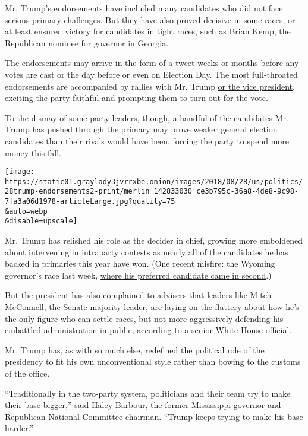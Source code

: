 Mr. Trump's endorsements have included many candidates who did not face
serious primary challenges. But they have also proved decisive in some
races, or at least ensured victory for candidates in tight races, such
as Brian Kemp, the Republican nominee for governor in Georgia.

The endorsements may arrive in the form of a tweet weeks or months
before any votes are cast or the day before or even on Election Day. The
most full-throated endorsements are accompanied by rallies with Mr.
Trump
\href{https://www.nytimes3xbfgragh.onion/2018/07/24/us/politics/kemp-cagle-georgia.html}{or
the vice president}, exciting the party faithful and prompting them to
turn out for the vote.

To the
\href{https://www.nytimes3xbfgragh.onion/2018/07/20/us/politics/trump-endorsement-kemp.html}{dismay
of some party leaders}, though, a handful of the candidates Mr. Trump
has pushed through the primary may prove weaker general election
candidates than their rivals would have been, forcing the party to spend
more money this fall.

\texttt{[image: https://static01.graylady3jvrrxbe.onion/images/2018/08/28/us/politics/28trump-endorsements2-print/merlin\_142833030\_ce3b795c-36a8-4de8-9c98-7fa3a06d1978-articleLarge.jpg?quality=75\\\&auto=webp\\\&disable=upscale]}

Mr. Trump has relished his role as the decider in chief, growing more
emboldened about intervening in intraparty contests as nearly all of the
candidates he has backed in primaries this year have won. (One recent
misfire: the Wyoming governor's race last week,
\href{https://www.nytimes3xbfgragh.onion/2018/08/21/us/politics/wyoming-alaska-primaries.html}{where
his preferred candidate came in second}.)

But the president has also complained to advisers that leaders like
Mitch McConnell, the Senate majority leader, are laying on the flattery
about how he's the only figure who can settle races, but not more
aggressively defending his embattled administration in public, according
to a senior White House official.

Mr. Trump has, as with so much else, redefined the political role of the
presidency to fit his own unconventional style rather than bowing to the
customs of the office.

``Traditionally in the two-party system, politicians and their team try
to make their base bigger,'' said Haley Barbour, the former Mississippi
governor and Republican National Committee chairman. ``Trump keeps
trying to make his base harder.''

